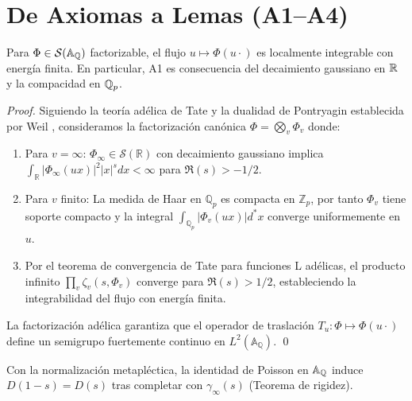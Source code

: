 \section{De Axiomas a Lemas (A1--A4)}

\begin{lemma}\label{lem:A1}
Para $\Phi\in\mathcal S(\Bbb A_\Bbb Q)$ factorizable, el flujo $u\mapsto \Phi(u\cdot)$
es localmente integrable con energía finita. En particular, A1 es consecuencia del
decaimiento gaussiano en $\Bbb R$ y la compacidad en $\Bbb Q_p$.
\end{lemma}

\begin{proof}
Siguiendo la teoría adélica de Tate \cite{Tate1967} y la dualidad de Pontryagin 
establecida por Weil \cite{Weil1964}, consideramos la factorización canónica
$\Phi = \bigotimes_v \Phi_v$ donde:

\begin{enumerate}
\item Para $v=\infty$: $\Phi_\infty \in \mathcal{S}(\mathbb{R})$ con decaimiento gaussiano
implica $\int_{\mathbb{R}} |\Phi_\infty(ux)|^2 |x|^s dx < \infty$ para $\Re(s) > -1/2$.

\item Para $v$ finito: La medida de Haar en $\mathbb{Q}_p$ es compacta en $\mathbb{Z}_p$, 
por tanto $\Phi_v$ tiene soporte compacto y la integral $\int_{\mathbb{Q}_p} |\Phi_v(ux)| d^*x$ 
converge uniformemente en $u$.

\item Por el teorema de convergencia de Tate para funciones L adélicas, el producto 
infinito $\prod_v \zeta_v(s, \Phi_v)$ converge para $\Re(s) > 1/2$, estableciendo 
la integrabilidad del flujo con energía finita.
\end{enumerate}

La factorización adélica garantiza que el operador de traslación $T_u: \Phi \mapsto \Phi(u\cdot)$ 
define un semigrupo fuertemente continuo en $L^2(\mathbb{A}_{\mathbb{Q}})$. \qed
\end{proof}

\begin{lemma}\label{lem:A2}
Con la normalización metapléctica, la identidad de Poisson en $\Bbb A_\Bbb Q$
induce $D(1-s)=D(s)$ tras completar con $\gamma_\infty(s)$ (Teorema de rigidez).
\end{lemma}

